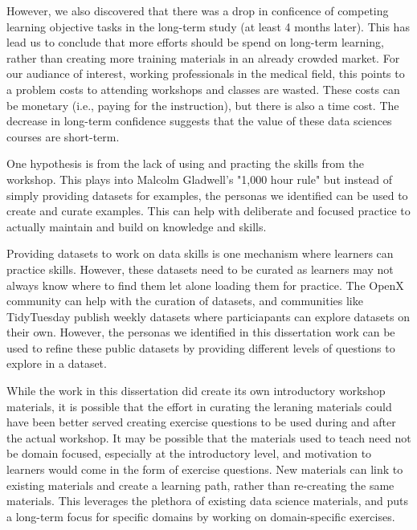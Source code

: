 \documentclass[doublespace,draft,nopageskip]{VTthesis} %
\begin{document}
        However, we also discovered that there was a drop in conficence of competing learning objective tasks
        in the long-term study (at least 4 months later).
        This has lead us to conclude that more efforts should be spend on long-term learning,
        rather than creating more training materials in an already crowded market.
        For our audiance of interest, working professionals in the medical field,
        this points to a problem costs to attending workshops and classes are wasted.
        These costs can be monetary (i.e., paying for the instruction), but there is also a time cost.
        The decrease in long-term confidence suggests that the value of these data sciences courses are short-term.

        One hypothesis is from the lack of using and practing the skills from the workshop.
        This plays into Malcolm Gladwell's "1,000 hour rule" but instead of simply providing datasets for examples,
        the personas we identified can be used to create and curate examples.
        This can help with deliberate and focused practice to actually maintain and build on knowledge and skills.

        Providing datasets to work on data skills is one mechanism where learners can practice skills.
        However, these datasets need to be curated as learners may not always know where to find them let alone loading them for practice.
        The OpenX community can help with the curation of datasets,
        and communities like TidyTuesday publish weekly datasets where particiapants can explore datasets on their own.
        However, the personas we identified in this dissertation work can be used to refine these public datasets
        by providing different levels of questions to explore in a dataset.

        While the work in this dissertation did create its own introductory workshop materials,
        it is possible that the effort in curating the leraning materials could have been better served creating exercise questions
        to be used during and after the actual workshop.
        It may be possible that the materials used to teach need not be domain focused,
        especially at the introductory level,
        and motivation to learners would come in the form of exercise questions.
        New materials can link to existing materials and create a learning path,
        rather than re-creating the same materials.
        This leverages the plethora of existing data science materials,
        and puts a long-term focus for specific domains by working on domain-specific exercises.
\end{document}
